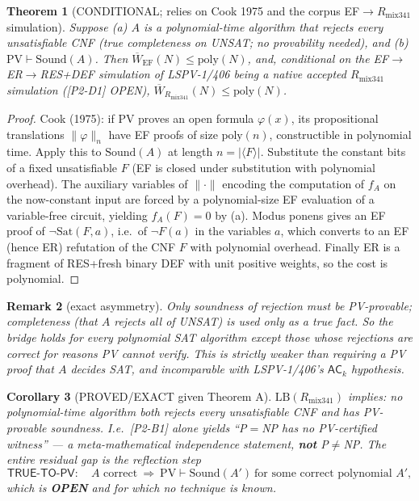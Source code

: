 \documentclass[11pt]{article}
\newtheorem{theorem}{Theorem}
\newtheorem{corollary}[theorem]{Corollary}
\newtheorem{remark}[theorem]{Remark}
\newcommand{\Wb}{\overline W}
\begin{document}
\begin{theorem}[CONDITIONAL; relies on Cook 1975 and the corpus EF$\to R_{\mathrm{mix341}}$ simulation]
Suppose (a) $A$ is a polynomial-time algorithm that rejects every unsatisfiable
CNF (true completeness on UNSAT; no provability needed), and (b)
$\mathrm{PV}\vdash\mathrm{Sound}(A)$. Then $\Wb_{\mathrm{EF}}(N)\le\mathrm{poly}(N)$,
and, conditional on the EF$\to$ER$\to$RES+DEF simulation of LSPV-1/406 being a
native accepted $R_{\mathrm{mix341}}$ simulation ([P2-D1] OPEN),
$\Wb_{R_{\mathrm{mix341}}}(N)\le\mathrm{poly}(N)$.
\end{theorem}
\begin{proof}
Cook (1975): if PV proves an open formula $\varphi(x)$, its propositional
translations $\|\varphi\|_n$ have EF proofs of size $\mathrm{poly}(n)$,
constructible in polynomial time. Apply this to $\mathrm{Sound}(A)$ at length
$n=|\langle F\rangle|$. Substitute the constant bits of a fixed unsatisfiable $F$
(EF is closed under substitution with polynomial overhead). The auxiliary
variables of $\|\cdot\|$ encoding the computation of $f_A$ on the now-constant
input are forced by a polynomial-size EF evaluation of a variable-free circuit,
yielding $f_A(F)=0$ by (a). Modus ponens gives an EF proof of
$\neg\mathrm{Sat}(F,a)$, i.e.\ of $\neg F(a)$ in the variables $a$, which
converts to an EF (hence ER) refutation of the CNF $F$ with polynomial
overhead. Finally ER is a fragment of RES+fresh binary DEF with unit positive
weights, so the cost is polynomial.
\end{proof}

\begin{remark}[exact asymmetry]
Only \emph{soundness} of rejection must be PV-provable; \emph{completeness}
(that $A$ rejects all of UNSAT) is used only as a true fact. So the bridge holds
for every polynomial SAT algorithm except those whose rejections are correct for
reasons PV cannot verify. This is strictly weaker than requiring a PV proof that
$A$ decides SAT, and incomparable with LSPV-1/406's $\mathsf{AC}_k$ hypothesis.
\end{remark}

\begin{corollary}[PROVED/EXACT given Theorem A]
$\mathrm{LB}(R_{\mathrm{mix341}})$ implies: no polynomial-time algorithm both
rejects every unsatisfiable CNF and has PV-provable soundness. I.e.\ [P2-B1]
alone yields ``P$=$NP has no PV-certified witness'' --- a meta-mathematical
independence statement, \textbf{not} P$\ne$NP. The entire residual gap is the
reflection step
\[
\textsf{TRUE-TO-PV}:\quad A \text{ correct}\ \Longrightarrow\ \mathrm{PV}\vdash
\mathrm{Sound}(A')\ \text{for some correct polynomial } A',
\]
which is \textbf{OPEN} and for which no technique is known.
\end{corollary}
\end{document}
